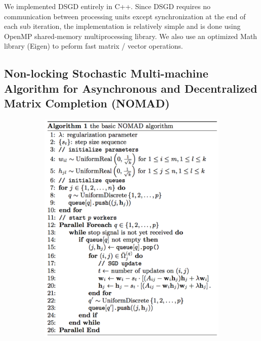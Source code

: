 \documentclass{article} %
\begin{document}
We implemented DSGD entirely in C++. Since DSGD requires no communication
between processing units except synchronization at the end of each sub
iteration, the implementation is relatively simple and is done using OpenMP
shared-memory multiprocessing library. We also use an optimized Math library
(Eigen) to peform fast matrix / vector operations.

\subsection{Non-locking Stochastic Multi-machine Algorithm for Asynchronous and Decentralized Matrix Completion (NOMAD)}

\begin{figure}[h]
  \centering
  \begin{subfigure}[b]{0.5\textwidth}
    \includegraphics[width=\textwidth]{figures/nomad-alg}
    \vspace{15pt}
  \end{subfigure}%
  ~ %

\end{figure}
\end{document}
